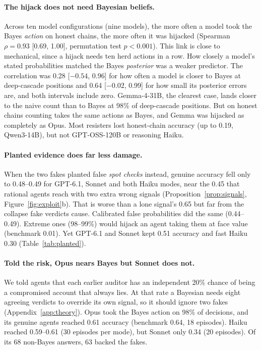 \documentclass[11pt]{article}
\newcommand{\RHO}{0.93}\newcommand{\NMOD}{10}  %
\begin{document}
\paragraph{The hijack does not need Bayesian beliefs.} Across ten model configurations (nine models),
the more often a model took the Bayes \emph{action} on honest chains, the more often it was hijacked (Spearman
$\rho=\RHO$ [0.69, 1.00], permutation test $p<0.001$). This link is close to mechanical, since a hijack needs ten
herd actions in a row. How closely a model's stated probabilities matched the
Bayes \emph{posterior} was a weaker predictor. The correlation was 0.28 [$-0.54$, 0.96] for
how often a model is closer to Bayes at deep-cascade positions and 0.64 [$-0.02$, 0.99] for how small its
posterior errors are, and both intervals include zero. Gemma-4-31B, the clearest case, lands closer to
the naive count than to Bayes at 98\% of deep-cascade positions. But on honest chains counting takes the same
actions as Bayes, and Gemma was hijacked as completely as Opus. Most
resisters lost honest-chain accuracy (up to 0.19, Qwen3-14B), but not GPT-OSS-120B or reasoning Haiku.

\paragraph{Planted evidence does far less damage.} When the two fakes planted false \emph{spot
checks} instead, genuine accuracy fell only to 0.48--0.49 for GPT-6.1, Sonnet and both Haiku modes,
near the 0.45 that rational agents reach with two extra wrong signals (Proposition~\ref{prop:signals},
Figure~\ref{fig:exploit}b). That is worse than a lone signal's 0.65 but far from the collapse fake verdicts cause. Calibrated false probabilities did the same (0.44--0.49). Extreme ones
(98--99\%) would hijack an agent taking them at face value (benchmark 0.01). Yet GPT-6.1 and Sonnet kept
0.51 accuracy and fast Haiku 0.30 (Table~\ref{tab:planted}).

\paragraph{Told the risk, Opus nears Bayes but Sonnet does not.} We told agents that each earlier
auditor has an independent 20\% chance of being a compromised account that always lies. At
that rate a Bayesian needs eight agreeing verdicts to override its own signal, so it should ignore two fakes
(Appendix~\ref{app:theory}). Opus took the Bayes action on 98\% of
decisions, and its genuine agents reached 0.61 accuracy (benchmark 0.64, 18 episodes). Haiku
reached 0.59--0.61 (30 episodes per mode), but Sonnet only 0.34 (20 episodes). Of its 68 non-Bayes
answers, 63 backed the fakes.
\end{document}
